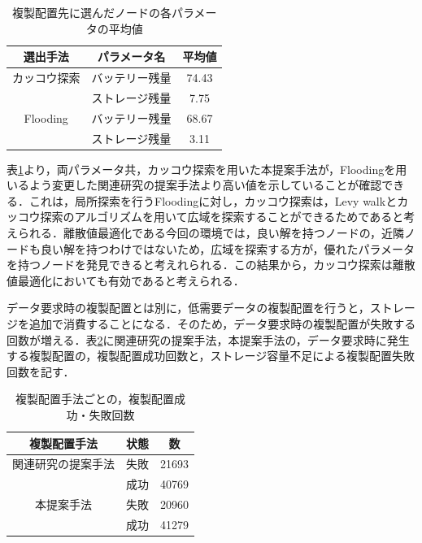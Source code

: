 \documentclass[11pt]{jreport}
\begin{document}
\begin{table}[H]
	\begin{center}
	\caption{複製配置先に選んだノードの各パラメータの平均値}
	\begin{tabular}{ | c | c | c | } \hline
	選出手法 & パラメータ名 & 平均値 \\ \hline \hline
	カッコウ探索 & バッテリー残量 & 74.43 \\ \cline{2-3}
		     & ストレージ残量 & 7.75 \\ \hline
	Flooding & バッテリー残量 & 68.67 \\ \cline{2-3}
		     & ストレージ残量 & 3.11 \\ \hline
	\end{tabular}
	\label{tab:node}
	\end{center}
\end{table}

\par 表\ref{tab:node}より，両パラメータ共，カッコウ探索を用いた本提案手法が，Floodingを用いるよう変更した関連研究の提案手法より高い値を示していることが確認できる．これは，局所探索を行うFloodingに対し，カッコウ探索は，Levy walkとカッコウ探索のアルゴリズムを用いて広域を探索することができるためであると考えられる．離散値最適化である今回の環境では，良い解を持つノードの，近隣ノードも良い解を持つわけではないため，広域を探索する方が，優れたパラメータを持つノードを発見できると考えれられる．この結果から，カッコウ探索は離散値最適化においても有効であると考えられる．
\par データ要求時の複製配置とは別に，低需要データの複製配置を行うと，ストレージを追加で消費することになる．そのため，データ要求時の複製配置が失敗する回数が増える．表\ref{tab:num}に関連研究の提案手法，本提案手法の，データ要求時に発生する複製配置の，複製配置成功回数と，ストレージ容量不足による複製配置失敗回数を記す．

\begin{table}[H]
	\begin{center}
	\caption{複製配置手法ごとの，複製配置成功・失敗回数}
	\begin{tabular}{ | c | c | c | } \hline
	複製配置手法 & 状態 & 数 \\ \hline \hline
	関連研究の提案手法 & 失敗 & 21693 \\ \cline{2-3}
		     & 成功 & 40769 \\ \hline
    本提案手法 & 失敗 & 20960 \\ \cline{2-3}
		     & 成功 & 41279 \\ \hline
	\end{tabular}
	\label{tab:num}
	\end{center}
\end{table}
\end{document}
